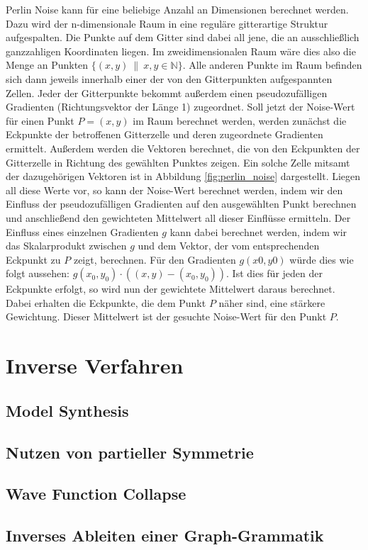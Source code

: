 Perlin Noise kann für eine beliebige Anzahl an Dimensionen berechnet werden. Dazu wird der n-dimensionale Raum in eine reguläre gitterartige
Struktur aufgespalten. Die Punkte auf dem Gitter sind dabei all jene, die an ausschließlich ganzzahligen Koordinaten liegen. Im zweidimensionalen
Raum wäre dies also die Menge an Punkten \(\{(x, y) \ \| \ x, y \in \mathbb{N}\}\). Alle anderen Punkte im Raum befinden sich dann jeweils innerhalb
einer der von den Gitterpunkten aufgespannten Zellen. Jeder der Gitterpunkte bekommt außerdem einen pseudozufälligen Gradienten (Richtungsvektor
der Länge 1) zugeordnet. Soll jetzt der Noise-Wert für einen Punkt \(P = (x, y)\) im Raum berechnet werden, werden zunächst die Eckpunkte der
betroffenen Gitterzelle und deren zugeordnete Gradienten ermittelt. Außerdem werden die Vektoren berechnet, die von den Eckpunkten der Gitterzelle
in Richtung des gewählten Punktes zeigen. Ein solche Zelle mitsamt der dazugehörigen Vektoren ist in Abbildung \ref{fig:perlin_noise} dargestellt.
Liegen all diese Werte vor, so kann der Noise-Wert berechnet werden, indem wir den Einfluss der pseudozufälligen Gradienten auf den ausgewählten
Punkt berechnen und anschließend den gewichteten Mittelwert all dieser Einflüsse ermitteln. Der Einfluss eines einzelnen Gradienten \(g\) kann
dabei berechnet werden, indem wir das Skalarprodukt zwischen \(g\) und dem Vektor, der vom entsprechenden Eckpunkt zu \(P\) zeigt, berechnen.
Für den Gradienten \(g(x0,y0)\) würde dies wie folgt aussehen: \(g(x_0,y_0) \cdot ((x,y)-(x_0,y_0))\). Ist dies für jeden der Eckpunkte erfolgt,
so wird nun der gewichtete Mittelwert daraus berechnet. Dabei erhalten die Eckpunkte, die dem Punkt \(P\) näher sind, eine stärkere Gewichtung.
Dieser Mittelwert ist der gesuchte Noise-Wert für den Punkt \(P\). \cite{43_zucker}

\section{Inverse Verfahren}
\subsection{Model Synthesis}
\subsection{Nutzen von partieller Symmetrie}
\subsection{Wave Function Collapse}
\subsection{Inverses Ableiten einer Graph-Grammatik}
